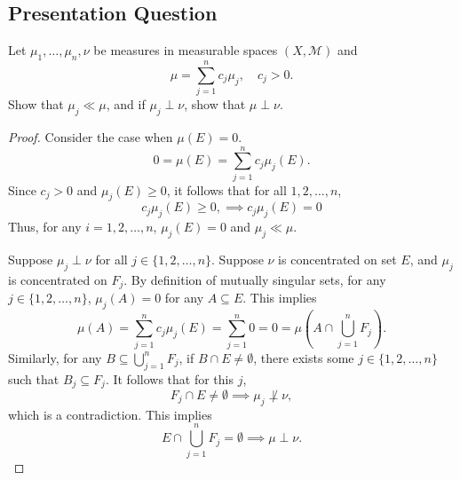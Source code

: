 \documentclass[class=book, crop=false]{standalone}
\begin{document}
        \subsection{Presentation Question}
        \begin{question}
            Let $\mu_1, \dots, \mu_n, \nu$ be measures in measurable spaces $(X, \mathscr{M})$ and
            \begin{equation*}
                \mu = \sum^{n}_{j = 1} c_j \mu_j, \quad c_j > 0.
            \end{equation*}
            Show that $\mu_j \ll \mu$, and if $\mu_j \perp \nu$, show that $\mu \perp \nu$.
        \end{question}
        \begin{proof}
             Consider the case when $\mu(E) = 0$.
             \begin{equation*}
                 0 = \mu(E) = \sum^{n}_{j = 1} c_j \mu_j(E).
             \end{equation*}
             Since $c_j > 0$ and $\mu_j(E) \geq 0$, it follows that for all $1, 2, \dots, n$,
             \begin{equation*}
                 c_j \mu_j(E) \geq 0, \implies c_j \mu_j(E) = 0
             \end{equation*}
            Thus, for any $i = 1, 2, \dots, n$, $\mu_j(E) = 0$ and $\mu_j \ll \mu$.

            \noindent Suppose $\mu_j \perp \nu$ for all $j \in \{1, 2, \dots, n\}$. Suppose $\nu$ is concentrated on set $E$, and $\mu_j$ is concentrated on $F_j$. By definition of mutually singular sets, for any $j \in \{1, 2, \dots, n\}$, $\mu_{j}(A) = 0$ for any $A \subseteq E$. This implies
            \begin{equation*}
                \mu(A) = \sum^{n}_{j = 1} c_j \mu_j(E) = \sum^{n}_{j = 1} 0 = 0 = \mu\left(A \cap \bigcup^{n}_{j = 1} F_j\right).
            \end{equation*}
            Similarly, for any $B \subseteq \bigcup^{n}_{j = 1} F_j$, if $B \cap E \neq \emptyset$, there exists some $j \in \{1, 2, \dots, n\}$ such that $B_j \subseteq F_j$. It follows that for this $j$,
            \begin{equation*}
                F_j \cap E \neq \emptyset \implies \mu_j \not\perp \nu,
            \end{equation*}
            which is a contradiction. This implies
            \begin{equation*}
                E \cap \bigcup^{n}_{j = 1} F_j = \emptyset \implies \mu \perp \nu.
            \end{equation*}
        \end{proof}
\end{document}
